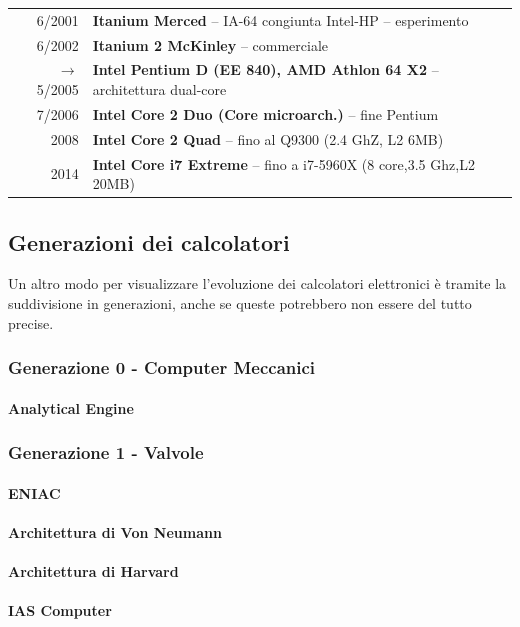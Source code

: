 \documentclass{article}
\newcommand{\foo}{\hspace{-2.3pt}$\bullet$ \hspace{5pt}}
\begin{document}
{\begin{tabular}{r |@{\foo} l}
			6/2001 & \textbf{Itanium Merced} – IA-64 congiunta Intel-HP – esperimento\\
			6/2002 & \textbf{Itanium 2 McKinley} – commerciale\\
			$\rightarrow$ 5/2005 & \textbf{Intel Pentium D (EE 840), AMD Athlon 64 X2} – architettura dual-core\\
			7/2006 & \textbf{Intel Core 2 Duo (Core microarch.)} – fine Pentium\\
			2008 & \textbf{Intel Core 2 Quad} – fino al Q9300 (2.4 GhZ, L2 6MB)\\
			2014 & \textbf{Intel Core i7 Extreme} – fino a i7-5960X (8 core,3.5 Ghz,L2 20MB)\\
		\end{tabular}
	}
	\subsection{Generazioni dei calcolatori}
	Un altro modo per visualizzare l'evoluzione dei calcolatori elettronici è tramite la suddivisione in generazioni, anche se queste potrebbero non essere del tutto precise.
	\subsubsection{Generazione 0 - Computer Meccanici}
	\paragraph{Analytical Engine}
	\subsubsection{Generazione 1 - Valvole}
	\paragraph{ENIAC}
	\paragraph{Architettura di Von Neumann}
	\paragraph{Architettura di Harvard}
	\paragraph{IAS Computer}
\end{document}

